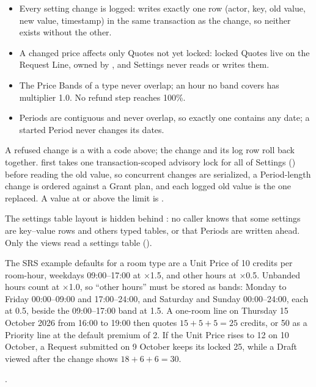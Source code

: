 \begin{itemize}
\item Every setting change is logged:  writes exactly one  row (actor, key, old value, new value, timestamp) in the same transaction as the change, so neither exists without the other.
\item A changed price affects only Quotes not yet locked: locked Quotes live on the Request Line, owned by , and Settings never reads or writes them.
\item The Price Bands of a type never overlap; an hour no band covers has multiplier 1.0. No refund step reaches 100\%.
\item Periods are contiguous and never overlap, so exactly one contains any date; a started Period never changes its dates.
\end{itemize}

A refused change is a  with a code above; the change and its log row roll back together.  first takes one transaction-scoped advisory lock for all of Settings () before reading the old value, so concurrent changes are serialized, a Period-length change is ordered against a Grant plan, and each logged old value is the one replaced. A value at or above the  limit is .

The settings table layout is hidden behind : no caller knows that some settings are key--value rows and others typed tables, or that Periods are written ahead. Only the  views read a settings table ().

The SRS example defaults for a room type are a Unit Price of 10 credits per room-hour, weekdays 09:00--17:00 at $\times$1.5, and other hours at $\times$0.5. Unbanded hours count at $\times$1.0, so ``other hours'' must be stored as bands: Monday to Friday 00:00--09:00 and 17:00--24:00, and Saturday and Sunday 00:00--24:00, each at 0.5, beside the 09:00--17:00 band at 1.5. A one-room line on Thursday 15 October 2026 from 16:00 to 19:00 then quotes $15 + 5 + 5 = 25$ credits, or 50 as a Priority line at the default premium of 2. If the Unit Price rises to 12 on 10 October, a Request submitted on 9 October keeps its locked 25, while a Draft viewed after the change shows $18 + 6 + 6 = 30$.

.

